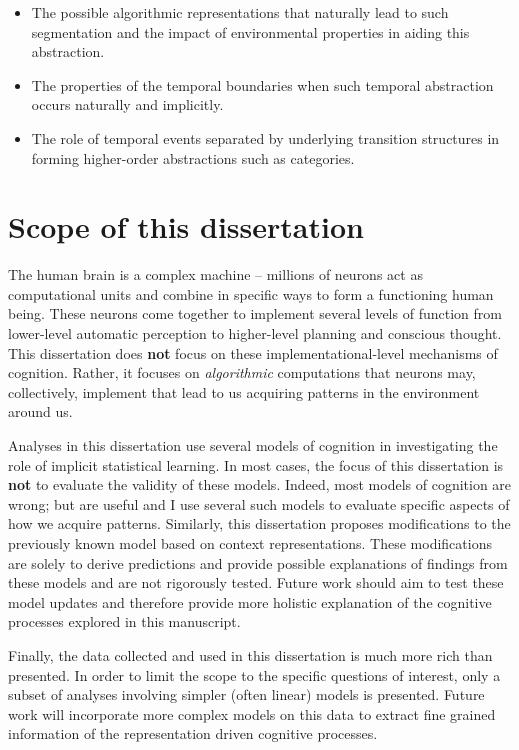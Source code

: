 \begin{itemize}
	\item
	The possible algorithmic representations that naturally lead to such segmentation and the impact of environmental properties in aiding this abstraction.
	\item
	The properties of the temporal boundaries when such temporal abstraction occurs naturally and implicitly.
	\item
	The role of temporal events separated by underlying transition structures in forming higher-order abstractions such as categories.
\end{itemize}

\section{Scope of this dissertation}\label{scope-of-this-dissertation}

The human brain is a complex machine -- millions of neurons act as computational units and combine in specific ways to form a functioning human being. These neurons come together to implement several levels of function from lower-level automatic perception to higher-level planning and conscious thought. This dissertation does \textbf{not} focus on these implementational-level mechanisms of cognition. Rather, it focuses on \emph{algorithmic} computations that neurons may, collectively, implement that lead to us acquiring patterns in the environment around us.

Analyses in this dissertation use several models of cognition in investigating the role of implicit statistical learning. In most cases, the focus of this dissertation is \textbf{not} to evaluate the validity of these models. Indeed, most models of cognition are wrong; but are useful and I use several such models to evaluate specific aspects of how we acquire patterns. Similarly, this dissertation proposes modifications to the previously known model based on context representations. These modifications are solely to derive predictions and provide possible explanations of findings from these models and are not rigorously tested. Future work should aim to test these model updates and therefore provide more holistic explanation of the cognitive processes explored in this manuscript.

Finally, the data collected and used in this dissertation is much more rich than presented. In order to limit the scope to the specific questions of interest, only a subset of analyses involving simpler (often linear) models is presented. Future work will incorporate more complex models on this data to extract fine grained information of the representation driven cognitive processes.

